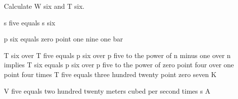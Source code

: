 Calculate W six and T six. 

s five equals s six

p six equals zero point one nine one bar

T six over T five equals p six over p five to the power of n minus one over n implies T six equals p six over p five to the power of zero point four over one point four times T five equals three hundred twenty point zero seven K

V five equals two hundred twenty meters cubed per second times s A